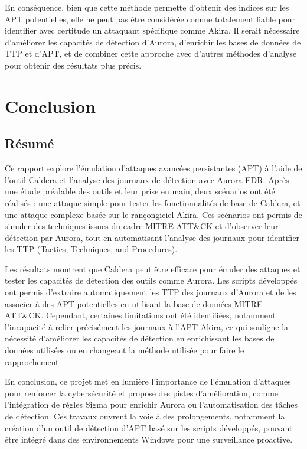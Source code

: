 \documentclass[12pt,letterpaper]{article}
\begin{document}
\bigskip

En conséquence, bien que cette méthode permette d'obtenir des indices sur les APT potentielles, elle ne peut pas être considérée comme totalement fiable pour identifier avec certitude un attaquant spécifique comme Akira.
Il serait nécessaire d'améliorer les capacités de détection d'Aurora, d'enrichir les bases de données de TTP et d'APT, et de combiner cette approche avec d'autres méthodes d'analyse pour obtenir des résultats plus précis.

\newpage
\section{Conclusion}

\subsection{Résumé}
Ce rapport explore l'émulation d'attaques avancées persistantes (APT) à l'aide de l'outil Caldera et l'analyse des journaux de détection avec Aurora EDR.
Après une étude préalable des outils et leur prise en main, deux scénarios ont été réalisés : une attaque simple pour tester les fonctionnalités de base de Caldera, et une attaque complexe basée sur le rançongiciel Akira.
Ces scénarios ont permis de simuler des techniques issues du cadre MITRE ATT\&CK et d'observer leur détection par Aurora, tout en automatisant l'analyse des journaux pour identifier les TTP (Tactics, Techniques, and Procedures).

\bigskip

Les résultats montrent que Caldera peut être efficace pour émuler des attaques et tester les capacités de détection des outils comme Aurora.
Les scripts développés ont permis d'extraire automatiquement les TTP des journaux d'Aurora et de les associer à des APT potentielles en utilisant la base de données MITRE ATT\&CK.
Cependant, certaines limitations ont été identifiées, notamment l'incapacité à relier précisément les journaux à l'APT Akira, ce qui souligne la nécessité d'améliorer les capacités de détection en enrichissant les bases de données utilisées ou en changeant la méthode utilisée pour faire le rapprochement.

\bigskip

En conclusion, ce projet met en lumière l'importance de l'émulation d'attaques pour renforcer la cybersécurité et propose des pistes d'amélioration, comme l'intégration de règles Sigma pour enrichir Aurora ou l'automatisation des tâches de détection.
Ces travaux ouvrent la voie à des prolongements, notamment la création d'un outil de détection d'APT basé sur les scripts développés, pouvant être intégré dans des environnements Windows pour une surveillance proactive.
\end{document}
